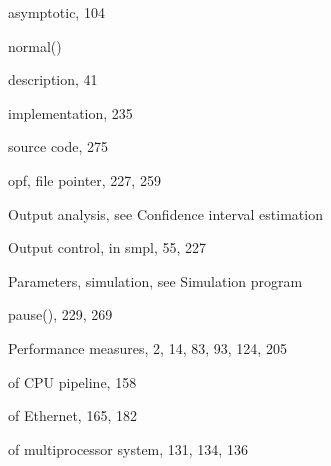 \quad asymptotic, 104\par
\noindent normal()\par
\quad description, 41\par
\quad implementation, 235\par
\quad source code, 275\par
\noindent opf, file pointer, 227, 259\par
\noindent Output analysis, see Confidence interval estimation\par
\noindent Output control, in smpl, 55, 227\par
\noindent Parameters, simulation, see Simulation program\par
\noindent pause(), 229, 269\par
\noindent Performance measures, 2, 14, 83, 93, 124, 205\par
\quad of CPU pipeline, 158\par
\quad of Ethernet, 165, 182\par
\quad of multiprocessor system, 131, 134, 136\par
